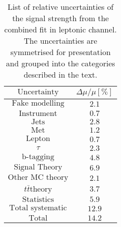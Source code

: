 \begin{table}[htbp]
\caption{List of relative uncertainties of the signal strength from the combined fit in leptonic channel. The uncertainties are symmetrised for presentation and grouped into  the categories described in the text. %
}
\small
\centering
\begin{tabular}{cc} \toprule\toprule
$\text{Uncertainty}        $ & $  \Delta\mu/\mu[\%]  $\\\midrule
$\text{Fake modelling}     $ & $       2.1             $\\
$\text{Instrument}         $ & $       0.7             $\\
$\text{Jets}               $ & $       2.8             $\\
$\text{Met}                $ & $       1.2             $\\
$\text{Lepton}             $ & $       0.7             $\\
$\tau                      $ & $       2.3             $\\
$\text{b-tagging}          $ & $       4.8             $\\
$\text{Signal Theory}      $ & $       6.9             $\\
$\text{Other MC theory}    $ & $       2.1             $\\
$t\bar{t} \text{theory}    $ & $       3.7             $\\\midrule
$\text{Statistics}         $ & $       5.9             $\\
$\text{Total systematic}   $ & $       12.9            $\\\midrule
$\text{Total}              $ & $       14.2            $\\
\bottomrule\bottomrule
\end{tabular}
\label{tab:lep_sys_impact}
\end{table} 





